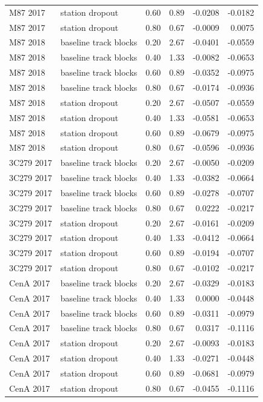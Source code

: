\begin{table}[t]
\begin{tabular}{llrrrr}
M87 2017 & station dropout & 0.60 & 0.89 & -0.0208 & -0.0182 \\
M87 2017 & station dropout & 0.80 & 0.67 & -0.0009 & 0.0075 \\
M87 2018 & baseline track blocks & 0.20 & 2.67 & -0.0401 & -0.0559 \\
M87 2018 & baseline track blocks & 0.40 & 1.33 & -0.0082 & -0.0653 \\
M87 2018 & baseline track blocks & 0.60 & 0.89 & -0.0352 & -0.0975 \\
M87 2018 & baseline track blocks & 0.80 & 0.67 & -0.0174 & -0.0936 \\
M87 2018 & station dropout & 0.20 & 2.67 & -0.0507 & -0.0559 \\
M87 2018 & station dropout & 0.40 & 1.33 & -0.0581 & -0.0653 \\
M87 2018 & station dropout & 0.60 & 0.89 & -0.0679 & -0.0975 \\
M87 2018 & station dropout & 0.80 & 0.67 & -0.0596 & -0.0936 \\
3C279 2017 & baseline track blocks & 0.20 & 2.67 & -0.0050 & -0.0209 \\
3C279 2017 & baseline track blocks & 0.40 & 1.33 & -0.0382 & -0.0664 \\
3C279 2017 & baseline track blocks & 0.60 & 0.89 & -0.0278 & -0.0707 \\
3C279 2017 & baseline track blocks & 0.80 & 0.67 & 0.0222 & -0.0217 \\
3C279 2017 & station dropout & 0.20 & 2.67 & -0.0161 & -0.0209 \\
3C279 2017 & station dropout & 0.40 & 1.33 & -0.0412 & -0.0664 \\
3C279 2017 & station dropout & 0.60 & 0.89 & -0.0194 & -0.0707 \\
3C279 2017 & station dropout & 0.80 & 0.67 & -0.0102 & -0.0217 \\
CenA 2017 & baseline track blocks & 0.20 & 2.67 & -0.0329 & -0.0183 \\
CenA 2017 & baseline track blocks & 0.40 & 1.33 & 0.0000 & -0.0448 \\
CenA 2017 & baseline track blocks & 0.60 & 0.89 & -0.0311 & -0.0979 \\
CenA 2017 & baseline track blocks & 0.80 & 0.67 & 0.0317 & -0.1116 \\
CenA 2017 & station dropout & 0.20 & 2.67 & -0.0093 & -0.0183 \\
CenA 2017 & station dropout & 0.40 & 1.33 & -0.0271 & -0.0448 \\
CenA 2017 & station dropout & 0.60 & 0.89 & -0.0681 & -0.0979 \\
CenA 2017 & station dropout & 0.80 & 0.67 & -0.0455 & -0.1116 \\
\hline
\end{tabular}
\end{table}